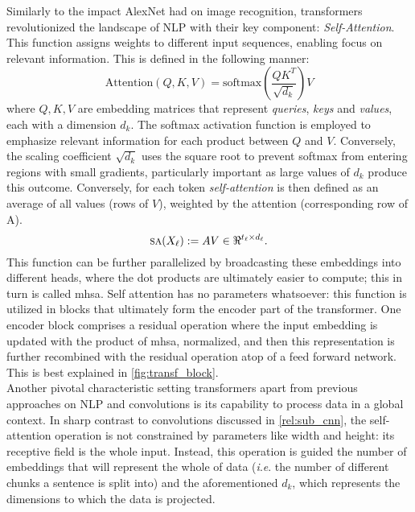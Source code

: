 \noindent Similarly to the impact AlexNet had on image recognition, transformers 
revolutionized the landscape of NLP with their key component: \emph{Self-Attention}. This function 
assigns weights to different input sequences, enabling focus on relevant information. 
This is defined in the following manner:
\begin{equation}
    \mbox{Attention}(Q, K, V) = \mbox{softmax}\left(\frac{QK^T}{\sqrt{d_k}}\right) V
    \label{eq:att}
\end{equation}
\noindent where $Q, K, V$ are embedding matrices that represent \emph{queries}, \emph{keys} and 
\emph{values}, each with a dimension $d_k$. The softmax activation function is employed to 
emphasize relevant information for each product between $Q$ and $V$. Conversely, the scaling 
coefficient $\sqrt{d_k}$ uses the square root to prevent softmax from entering regions with small 
gradients, particularly important as large values of $d_k$ produce this outcome. Conversely, for 
each token \emph{self-attention} is then defined as an average of all values (rows of $V$), weighted 
by the attention (corresponding row of A).
\begin{equation}
	\sa(X_\ell) \defn A V \in \real^{t_\ell \times d_\ell}.
\label{eq:SA}
\end{equation}
This function can be further parallelized by broadcasting these embeddings into different 
heads, where the dot products are ultimately easier to compute; this in turn is called \gls{mhsa}.
Self attention has no parameters whatsoever: this function is utilized in blocks that ultimately 
form the encoder part of the transformer. One encoder block comprises a residual operation where 
the input embedding is updated with the product of \gls{mhsa}, normalized, and then this 
representation is further recombined with the residual operation atop of 
a feed forward network. This is best explained in \autoref{fig:transf_block}.\\


\noindent Another pivotal characteristic setting transformers apart from previous approaches on NLP 
and convolutions is its capability to process data in a global context. In sharp contrast to 
convolutions discussed in \autoref{rel:sub_cnn}, the self-attention operation is not constrained by 
parameters like width and height: its receptive field is the whole input. Instead, this operation 
is guided the number of embeddings that will represent the whole of data (\textit{i}.\textit{e}. 
the number of different chunks a sentence is split into) and the aforementioned $d_k$, which 
represents the dimensions to which the data is projected. \\

